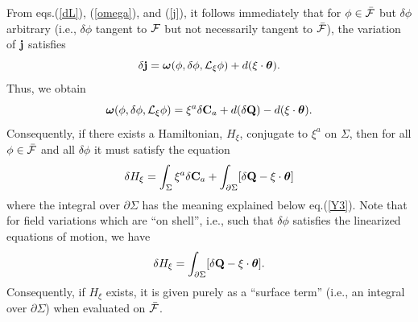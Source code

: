{}From eqs.(\ref{dL}), (\ref{omega}), and (\ref{j}), it follows
immediately that for $\phi \in \bar{\cal F}$ but $\delta \phi$
arbitrary (i.e., $\delta \phi$ tangent to $\cal F$ but not necessarily
tangent to $\bar{\cal F}$), the variation of ${\bf j}$ satisfies
\begin{equation}
\delta {\bf j} = {\mbox{\boldmath $\omega$}} (\phi, \delta \phi, {\cal
L}_\xi \phi) + d(\xi \cdot {\mbox{\boldmath $\theta$}}) .
\label{dj}
\end{equation}
Thus, we obtain
\begin{equation}
{\mbox{\boldmath $\omega$}} (\phi, \delta \phi, {\cal L}_\xi \phi) =
\xi^a \delta {\bf {C}}_a + d (\delta {\bf Q}) - d(\xi \cdot
{\mbox{\boldmath $\theta$}}) .
\label{dj2}
\end{equation}
Consequently, if there exists a Hamiltonian, $H_\xi$, conjugate to
$\xi^a$ on $\Sigma$, then for all $\phi \in \bar{\cal F}$ and all $\delta
\phi$ it must satisfy the equation
\begin{equation}
\delta H_\xi = \int_\Sigma
\xi^a \delta {\bf {C}}_a + \int_{\partial \Sigma} [\delta {\bf Q} - \xi \cdot
{\mbox{\boldmath $\theta$}}]
\label{dh}
\end{equation}
where the integral over $\partial \Sigma$ has the meaning explained
below eq.(\ref{Y3}). Note that for field variations which are ``on
shell'', i.e., such that $\delta \phi$ satisfies the linearized
equations of motion, we have
\begin{equation}
\delta H_\xi = \int_{\partial \Sigma} [\delta {\bf Q} - \xi \cdot
{\mbox{\boldmath $\theta$}}] .
\label{hsurf}
\end{equation}
Consequently, if $H_\xi$ exists, it is given purely as a ``surface
term'' (i.e., an integral over $\partial \Sigma$) when evaluated on
$\bar{\cal F}$.

